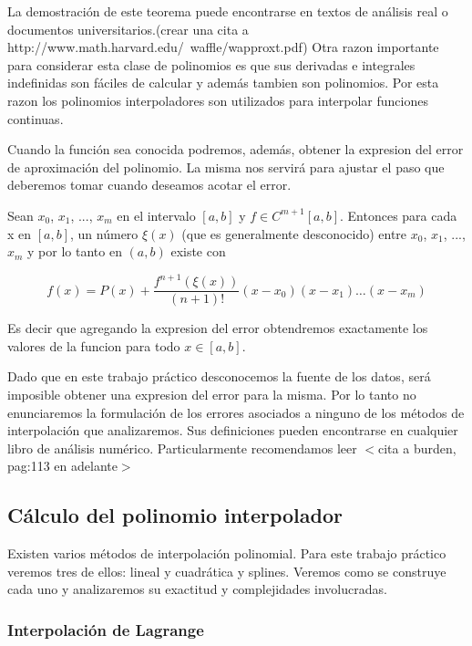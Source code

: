 La demostración de este teorema puede encontrarse en textos de análisis real o documentos universitarios.(crear una cita a http://www.math.harvard.edu/~waffle/wapproxt.pdf)
Otra razon importante para considerar esta clase de polinomios es que sus derivadas e integrales indefinidas son fáciles de calcular y además tambien son polinomios. Por esta razon los polinomios interpoladores son utilizados para interpolar funciones continuas.

Cuando la función sea conocida podremos, además, obtener la expresion del error de aproximación del polinomio. La misma nos servirá para ajustar el paso que deberemos tomar cuando deseamos acotar el error. 

\begin{theorem}
	\item Sean $x_0$, $x_1$, ..., $x_m$ en el intervalo $[a, b]$ y $f \in C^{m+1}[a, b]$. Entonces para cada x en $[a, b]$, un número $\xi(x)$ (que es generalmente desconocido) entre $x_0$, $x_1$, ..., $x_m$ y por lo tanto en $(a, b)$ existe con	
\end{theorem}

\begin{equation}
	f(x) = P(x) + \dfrac{f^{n+1}(\xi(x))}{(n+1)!}(x - x_0)(x - x_1)\dots(x - x_m)
\end{equation}

Es decir que agregando la expresion del error obtendremos exactamente los valores de la funcion para todo $x \in [a, b]$.

Dado que en este trabajo práctico desconocemos la fuente de los datos, será imposible obtener una expresion del error para la misma. Por lo tanto no enunciaremos la formulación de los errores asociados a ninguno de los métodos de interpolación que analizaremos. Sus definiciones pueden encontrarse en cualquier libro de análisis numérico. Particularmente recomendamos leer $<$cita a burden, pag:113 en adelante$>$

\subsection{Cálculo del polinomio interpolador}

Existen varios métodos de interpolación polinomial. Para este trabajo práctico veremos tres de ellos: lineal y cuadrática y splines. Veremos como se construye cada uno y analizaremos su exactitud y complejidades involucradas.

\subsubsection{Interpolación de Lagrange}

